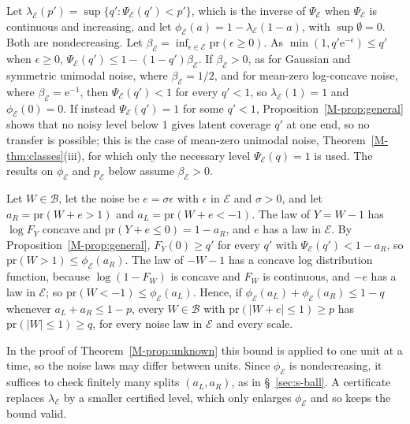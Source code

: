\documentclass[11pt]{article}
\renewcommand{\_}{\usc\allowbreak}
\newcommand{\pr}{\mathrm{pr}}
\begin{document}
Let $\lambda_{\mathcal E}(p') = \sup\{q' : \Psi_{\mathcal E}(q') < p'\}$, which is the inverse of $\Psi_{\mathcal E}$ when $\Psi_{\mathcal E}$ is continuous and increasing, and let $\phi_{\mathcal E}(a) = 1 - \lambda_{\mathcal E}(1 - a)$, with $\sup\emptyset = 0$. Both are nondecreasing. Let $\beta_{\mathcal E} = \inf_{\epsilon \in \mathcal E} \pr(\epsilon \ge 0)$. As $\min(1, q'\mathrm{e}^{-\epsilon}) \le q'$ when $\epsilon \ge 0$, $\Psi_{\mathcal E}(q') \le 1 - (1 - q')\beta_{\mathcal E}$. If $\beta_{\mathcal E} > 0$, as for Gaussian and symmetric unimodal noise, where $\beta_{\mathcal E} = 1/2$, and for mean-zero log-concave noise, where $\beta_{\mathcal E} = \mathrm{e}^{-1}$, then $\Psi_{\mathcal E}(q') < 1$ for every $q' < 1$, so $\lambda_{\mathcal E}(1) = 1$ and $\phi_{\mathcal E}(0) = 0$. If instead $\Psi_{\mathcal E}(q') = 1$ for some $q' < 1$, Proposition~\ref{M-prop:general} shows that no noisy level below $1$ gives latent coverage $q'$ at one end, so no transfer is possible; this is the case of mean-zero unimodal noise, Theorem~\ref{M-thm:classes}(iii), for which only the necessary level $\Psi_{\mathcal E}(q) = 1$ is used. The results on $\phi_{\mathcal E}$ and $p_{\mathcal E}$ below assume $\beta_{\mathcal E} > 0$.

Let $W \in \mathcal B$, let the noise be $e = \sigma\epsilon$ with $\epsilon$ in $\mathcal E$ and $\sigma > 0$, and let $a_R = \pr(W + e > 1)$ and $a_L = \pr(W + e < -1)$. The law of $Y = W - 1$ has $\log F_Y$ concave and $\pr(Y + e \le 0) = 1 - a_R$, and $e$ has a law in $\mathcal E$. By Proposition~\ref{M-prop:general}, $F_Y(0) \ge q'$ for every $q'$ with $\Psi_{\mathcal E}(q') < 1 - a_R$, so $\pr(W > 1) \le \phi_{\mathcal E}(a_R)$. The law of $-W - 1$ has a concave log distribution function, because $\log(1 - F_W)$ is concave and $F_W$ is continuous, and $-e$ has a law in $\mathcal E$; so $\pr(W < -1) \le \phi_{\mathcal E}(a_L)$. Hence, if $\phi_{\mathcal E}(a_L) + \phi_{\mathcal E}(a_R) \le 1 - q$ whenever $a_L + a_R \le 1 - p$, every $W \in \mathcal B$ with $\pr(|W + e| \le 1) \ge p$ has $\pr(|W| \le 1) \ge q$, for every noise law in $\mathcal E$ and every scale.

In the proof of Theorem~\ref{M-prop:unknown} this bound is applied to one unit at a time, so the noise laws may differ between units. Since $\phi_{\mathcal E}$ is nondecreasing, it suffices to check finitely many splits $(a_L, a_R)$, as in \S~\ref{sec:s-ball}. A certificate replaces $\lambda_{\mathcal E}$ by a smaller certified level, which only enlarges $\phi_{\mathcal E}$ and so keeps the bound valid.
\end{document}
